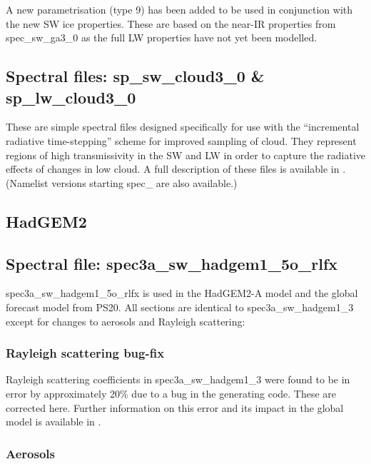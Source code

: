 A new parametrisation (type 9) has been added to be used in conjunction with the new SW ice properties. These are based on the near-IR properties from spec\_sw\_ga3\_0 as the full LW properties have not yet been modelled.


\subsection*{Spectral files: sp\_sw\_cloud3\_0 \& sp\_lw\_cloud3\_0}

These are simple spectral files designed specifically for use with the ``incremental radiative time-stepping'' scheme for improved sampling of cloud. They represent regions of high transmissivity in the SW and LW in order to capture the radiative effects of changes in low cloud. A full description of these files is available in \citet{Manners09}. (Namelist versions starting spec\_ are also available.)

\subsection{HadGEM2}

\subsection*{Spectral file: spec3a\_sw\_hadgem1\_5o\_rlfx}

spec3a\_sw\_hadgem1\_5o\_rlfx is used in the HadGEM2-A model and the global forecast model from PS20. All sections are identical to spec3a\_sw\_hadgem1\_3 except for changes to aerosols and Rayleigh scattering:


\subsubsection*{Rayleigh scattering bug-fix}

Rayleigh scattering coefficients in spec3a\_sw\_hadgem1\_3 were found to be in error by approximately 20\% due to a bug in the generating code. These are corrected here. Further information on this error and its impact in the global model is available in \citet{Haywood2008}.


\subsubsection*{Aerosols}

